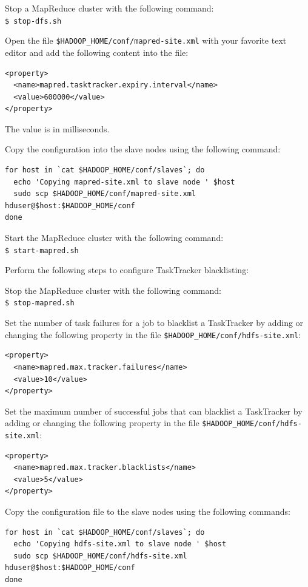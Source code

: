 Stop a MapReduce cluster with the following command:\\
\verb|$ stop-dfs.sh|

Open the file \verb|$HADOOP_HOME/conf/mapred-site.xml| with your favorite text editor and add the following content into the file:
\begin{verbatim} 
<property>
  <name>mapred.tasktracker.expiry.interval</name>
  <value>600000</value>
</property>
\end{verbatim}

The value is in milliseconds.

Copy the configuration into the slave nodes using the following command:
\lstset{style=bashstyle}
\begin{lstlisting}
for host in `cat $HADOOP_HOME/conf/slaves`; do
  echo 'Copying mapred-site.xml to slave node ' $host
  sudo scp $HADOOP_HOME/conf/mapred-site.xml hduser@$host:$HADOOP_HOME/conf
done
\end{lstlisting}

Start the MapReduce cluster with the following command: \\
\verb|$ start-mapred.sh|

Perform the following steps to configure TaskTracker blacklisting:

Stop the MapReduce cluster with the following command: \\
\verb|$ stop-mapred.sh|

Set the number of task failures for a job to blacklist a TaskTracker by adding or changing the following property in the file \verb|$HADOOP_HOME/conf/hdfs-site.xml|:
\lstset{style=bashstyle}
\begin{lstlisting}
<property>
  <name>mapred.max.tracker.failures</name>
  <value>10</value>
</property>
\end{lstlisting}

Set the maximum number of successful jobs that can blacklist a TaskTracker by adding or changing the following property in the file \verb|$HADOOP_HOME/conf/hdfs-site.xml|:
\lstset{style=bashstyle}
\begin{lstlisting}
<property>
  <name>mapred.max.tracker.blacklists</name>
  <value>5</value>
</property>
\end{lstlisting}

Copy the configuration file to the slave nodes using the following commands:
\lstset{style=bashstyle}
\begin{lstlisting}
for host in `cat $HADOOP_HOME/conf/slaves`; do
  echo 'Copying hdfs-site.xml to slave node ' $host
  sudo scp $HADOOP_HOME/conf/hdfs-site.xml hduser@$host:$HADOOP_HOME/conf
done
\end{lstlisting}

